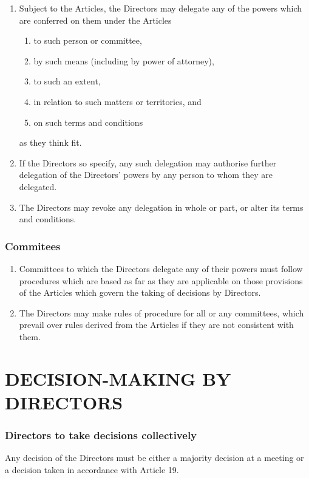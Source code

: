 \documentclass[a4paper,12pt]{article}
\begin{document}
\begin{enumerate}
  \item Subject to the Articles, the Directors may delegate any of the powers which are conferred on them under the Articles
  \begin{enumerate}
    \item to such person or committee,
    \item by such means (including by power of attorney),
    \item to such an extent,
    \item in relation to such matters or territories, and
    \item on such terms and conditions
  \end{enumerate}
  as they think fit.
  \item If the Directors so specify, any such delegation may authorise further delegation of the Directors' powers by any person to whom they are delegated.
  \item The Directors may revoke any delegation in whole or part, or alter its terms and conditions.
\end{enumerate}

\section{Commitees}

\begin{enumerate}
  \item Committees to which the Directors delegate any of their powers must follow procedures which are based as far as they are applicable on those provisions of the Articles which govern the taking of decisions by Directors.
  \item	The Directors may make rules of procedure for all or any committees, which prevail over rules derived from the Articles if they are not consistent with them.
\end{enumerate}

\part*{DECISION-MAKING BY DIRECTORS}

\section{Directors to take decisions collectively}

Any decision of the Directors must be either a majority decision at a meeting or a decision taken in accordance with Article 19.
\end{document}
